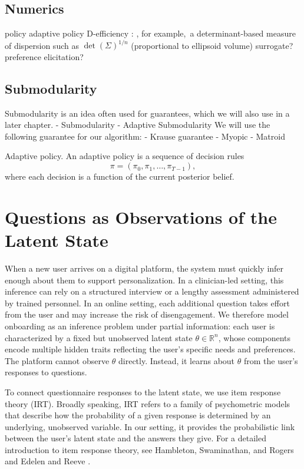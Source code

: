 \documentclass{article}
\begin{document}
\section{Numerics}
policy
adaptive policy
D-efficiency : , for example,\ a determinant-based measure of dispersion such as $\det(\Sigma)^{1/n}$ (proportional to ellipsoid volume)
surrogate?
preference elicitation?
\section{Submodularity}
Submodularity is an idea often used for guarantees, which we will also use in a later chapter.
- Submodularity
- Adaptive Submodularity
We will use the following guarantee for our algorithm:
- Krause guarantee
- Myopic
- Matroid

\begin{definition}{Adaptive policy.}
An adaptive policy is a sequence of decision rules
\begin{equation*}
\pi = (\pi_0,\pi_1,\dots,\pi_{T-1}),
\end{equation*}
where each decision is a function of the current posterior belief.
\end{definition}
\newpage
\chapter{Questions as Observations of the Latent State}\label{chapter:IRT}
When a new user arrives on a digital platform, the system must quickly infer enough about them to support personalization.  In a clinician-led
setting, this inference can rely on a structured interview or a lengthy assessment
administered by trained personnel. In an online setting, each additional question takes effort from the user and may increase the risk of disengagement. We therefore model onboarding as an inference
problem under partial information: each user is characterized by a fixed but unobserved
latent state $\theta \in \mathbb{R}^n$, whose components encode multiple hidden traits
reflecting the user’s specific needs and preferences. The platform cannot observe
$\theta$ directly. Instead, it learns about $\theta$ from the user’s responses to
questions.

To connect questionnaire responses to the latent state, we use item response theory
(IRT). Broadly speaking, IRT refers to a family of psychometric models that describe how the probability of a given response is determined by an
underlying, unobserved variable. In our setting, it provides the probabilistic link
between the user’s latent state and the answers they give. For a detailed introduction to item response theory, see Hambleton, Swaminathan, and Rogers \cite{hambletonSwaminathanRogers1991irt} and Edelen and Reeve \cite{edelenReeve2007irt}.
\end{document}
